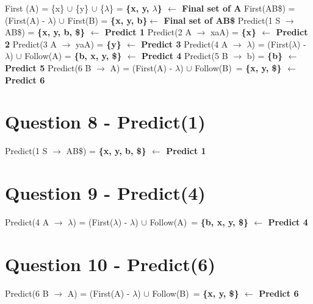 \documentclass{report}
\begin{document}
\begin{multicols}{2}
\indent\hspace{1cm}First (A) = \{x\} $\cup$ \{y\} $\cup$  \{$\lambda$\} = \textbf{ \{x, y, $\lambda$\} $\leftarrow$ Final set of A}\newline
\indent\hspace{.25cm}First(AB\$) = (First(A) - $\lambda$) $\cup$ First(B) = \textbf{ \{x, y, b\}$\leftarrow$ Final set of AB\$} \newline
Predict(1 S $\rightarrow$ AB\$) = \textbf{\{x, y, b, \$\} $\leftarrow$ Predict 1}\newline
Predict(2 A $\rightarrow$ xaA) = \textbf{ \{x\} $\leftarrow$ Predict 2}\newline
Predict(3 A $\rightarrow$ yaA) = \textbf{ \{y\} $\leftarrow$ Predict 3}\newline
Predict(4 A $\rightarrow$ $\lambda$) = (First($\lambda$) - $\lambda$) $\cup$ Follow(A)\newline
\indent\hspace{2.3cm}= \textbf{\{b, x, y, \$\} $\leftarrow$ Predict 4}\newline
Predict(5 B $\rightarrow$ b) = \textbf{\{b\} $\leftarrow$ Predict 5}\newline
Predict(6 B $\rightarrow$ A) = (First(A) - $\lambda$) $\cup$ Follow(B)\ = \textbf{\{x, y, \$\} $\leftarrow$ Predict 6}
\end{multicols}

\section{Question 8 - Predict(1)}
\hspace{-.3cm}Predict(1 S $\rightarrow$ AB\$) = \textbf{\{x, y, b, \$\} $\leftarrow$ Predict 1}

\section{Question 9 - Predict(4)}
\hspace{-.3cm}Predict(4 A $\rightarrow$ $\lambda$) = (First($\lambda$) - $\lambda$) $\cup$ Follow(A)\ = \textbf{\{b, x, y, \$\} $\leftarrow$ Predict 4}

\section{Question 10 - Predict(6)}
\hspace{-.3cm}Predict(6 B $\rightarrow$ A) = (First(A) - $\lambda$) $\cup$ Follow(B)\ = \textbf{\{x, y, \$\} $\leftarrow$ Predict 6}
\end{document}
